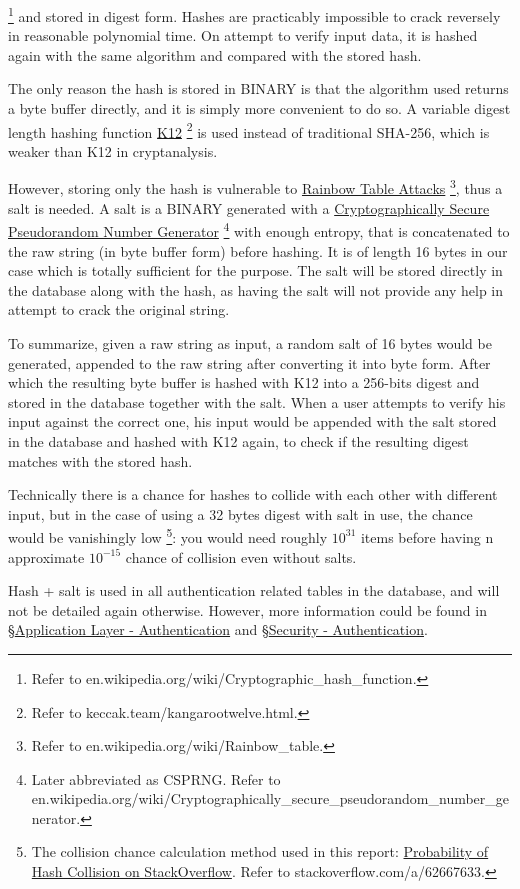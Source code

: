 \documentclass[12pt]{report}
\newcommand{\n}{\par}
\begin{document}
\footnote{Refer to en.wikipedia.org/wiki/Cryptographic\_hash\_function.}
and stored in digest form.
Hashes are practicably impossible to crack reversely in reasonable polynomial time.
On attempt to verify input data, it is hashed again with the same algorithm and compared with the stored hash.\n
The only reason the hash is stored in BINARY is that the algorithm used returns a byte buffer directly, and it is simply more convenient to do so.
A variable digest length hashing function
\href{https://keccak.team/kangarootwelve.html}{K12}
\footnote{Refer to keccak.team/kangarootwelve.html.}
is used instead of traditional SHA-256, which is weaker than K12 in cryptanalysis.\n
However, storing only the hash is vulnerable to
\href{https://en.wikipedia.org/wiki/Rainbow_table}{Rainbow Table Attacks}
\footnote{Refer to en.wikipedia.org\-/wiki/Rainbow\_table.},
thus a salt is needed. A salt is a BINARY generated with a
\href{https://en.wikipedia.org/wiki/Cryptographically_secure_pseudorandom_number_generator}{Cryptographically Secure Pseudorandom Number Generator}
\footnote{Later abbreviated as CSPRNG. Refer to en.wikipedia.org/wiki/Cryptographically\_secure\_pseudorandom\_number\_\-generator.}
with enough entropy, that is concatenated to the raw string (in byte buffer form) before hashing.
It is of length 16 bytes in our case which is totally sufficient for the purpose.
The salt will be stored directly in the database along with the hash,
as having the salt will not provide any help in attempt to crack the original string.\n
To summarize, given a raw string as input, a random salt of 16 bytes would be generated,
appended to the raw string after converting it into byte form.
After which the resulting byte buffer is hashed with K12 into a 256-bits digest and stored in the database together with the salt.
When a user attempts to verify his input against the correct one,
his input would be appended with the salt stored in the database and hashed with K12 again,
to check if the resulting digest matches with the stored hash.\n
Technically there is a chance for hashes to collide with each other with different input,
but in the case of using a 32 bytes digest with salt in use, the chance would be vanishingly low
\footnote{The collision chance calculation method used in this report: \href{https://stackoverflow.com/a/62667633}{Probability of Hash Collision on StackOverflow}. Refer to stackoverflow.com/a/62667633.}:
you would need roughly $10^{31}$ items before having n approximate $10^{-15}$ chance of collision even without salts.\n
Hash + salt is used in all authentication related tables in the database, and will not be detailed again otherwise.
However, more information could be found in
\S \hyperref[application-layer.implementation.authentication]{Application Layer - Authentication} and
\S \hyperref[security.authentication]{Security - Authentication}.
\end{document}
